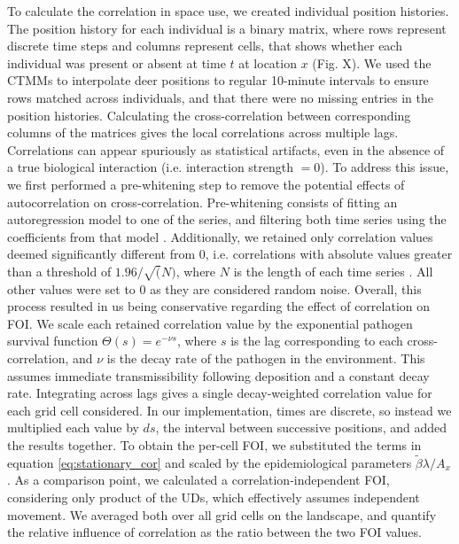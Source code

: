 \documentclass[letterpaper]{article}
\begin{document}
To calculate the correlation in space use, we created individual position histories. The position history for each individual is a binary matrix, where rows represent discrete time steps and columns represent cells, that shows whether each individual was present or absent at time $t$ at location $x$ (Fig. X). We used the CTMMs to interpolate deer positions to regular 10-minute intervals \citep{Yang2023} to ensure rows matched across individuals, and that there were no missing entries in the position histories. Calculating the cross-correlation between corresponding columns of the matrices gives the local correlations across multiple lags. %
Correlations can appear spuriously as statistical artifacts, even in the absence of a true biological interaction (i.e. interaction strength $=0$). To address this issue, we first performed a pre-whitening step to remove the potential effects of autocorrelation on cross-correlation. Pre-whitening consists of fitting an autoregression model to one of the series, and filtering both time series using the coefficients from that model \citep{Dean2016}. Additionally, we retained only correlation values deemed significantly different from 0, i.e. correlations with absolute values greater than a threshold of $1.96/\sqrt(N)$, where $N$ is the length of each time series \citep{Dean2016}. All other values were set to 0 as they are considered random noise. Overall, this process resulted in us being conservative regarding the effect of correlation on FOI.
We scale each retained correlation value by the exponential pathogen survival function $\Theta(s) = e^{-\nu s}$, where $s$ is the lag corresponding to each cross-correlation, and $\nu$ is the decay rate of the pathogen in the environment. This assumes immediate transmissibility following deposition and a constant decay rate. Integrating across lags gives a single decay-weighted correlation value for each grid cell considered. In our implementation, times are discrete, so instead we multiplied each value by $ds$, the interval between successive positions, and added the results together. To obtain the per-cell FOI, we substituted the terms in equation \ref{eq:stationary_cor} and scaled by the epidemiological parameters $\tilde\beta\lambda/ A_x$. As a comparison point, we calculated a correlation-independent FOI, considering only product of the UDs, which effectively assumes independent movement. We averaged both over all grid cells on the landscape, and quantify the relative influence of correlation as the ratio between the two FOI values. 
\end{document}
